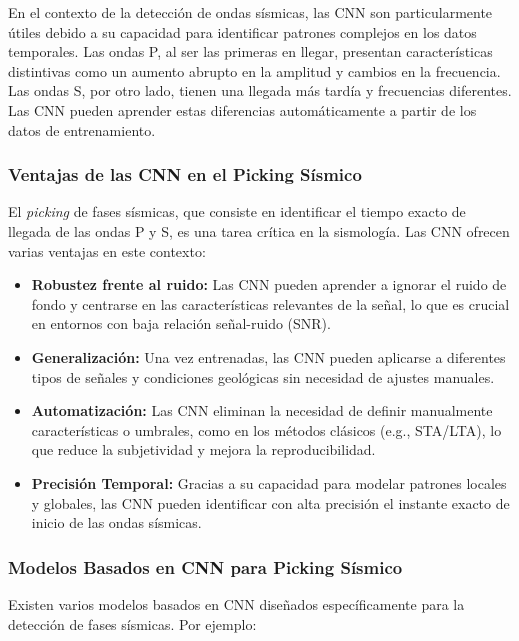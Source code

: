 En el contexto de la detección de ondas sísmicas, las CNN son particularmente útiles debido a su capacidad para identificar patrones complejos en los datos temporales. Las ondas P, al ser las primeras en llegar, presentan características distintivas como un aumento abrupto en la amplitud y cambios en la frecuencia. Las ondas S, por otro lado, tienen una llegada más tardía y frecuencias diferentes. Las CNN pueden aprender estas diferencias automáticamente a partir de los datos de entrenamiento.

\subsubsection{Ventajas de las CNN en el Picking Sísmico}

El \textit{picking} de fases sísmicas, que consiste en identificar el tiempo exacto de llegada de las ondas P y S, es una tarea crítica en la sismología. Las CNN ofrecen varias ventajas en este contexto:

\begin{itemize}
     \item \textbf{Robustez frente al ruido:} Las CNN pueden aprender a ignorar el ruido de fondo y centrarse en las características relevantes de la señal, lo que es crucial en entornos con baja relación señal-ruido (SNR).
     \item \textbf{Generalización:} Una vez entrenadas, las CNN pueden aplicarse a diferentes tipos de señales y condiciones geológicas sin necesidad de ajustes manuales.
     \item \textbf{Automatización:} Las CNN eliminan la necesidad de definir manualmente características o umbrales, como en los métodos clásicos (e.g., STA/LTA), lo que reduce la subjetividad y mejora la reproducibilidad.
     \item \textbf{Precisión Temporal:} Gracias a su capacidad para modelar patrones locales y globales, las CNN pueden identificar con alta precisión el instante exacto de inicio de las ondas sísmicas.
\end{itemize}

\subsubsection{Modelos Basados en CNN para Picking Sísmico}

Existen varios modelos basados en CNN diseñados específicamente para la detección de fases sísmicas. Por ejemplo:

